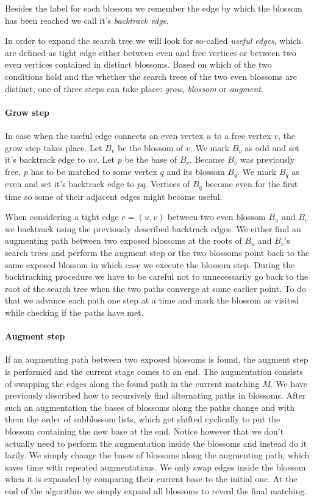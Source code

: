 Besides the label for each blossom we remember the edge by which the blossom has been reached we call it's \textit{backtrack edge}.

In order to expand the search tree we will look for so-called \textit{useful edges}, which are defined as tight edge either between even and free vertices or between two even vertices contained in distinct blossoms. Based on which of the two conditions hold and the whether the search trees of the two even blossoms are distinct, one of three steps can take place: \textit{grow}, \textit{blossom} or \textit{augment}.

\paragraph*{Grow step}

In case when the useful edge connects an even vertex $u$ to a free vertex $v$, the grow step takes place. Let $B_v$ be the blossom of $v$. We mark $B_v$ as odd and set it's backtrack edge to $uv$. Let $p$ be the base of $B_v$. Because $B_v$ was previously free, $p$ has to be matched to some vertex $q$ and its blossom $B_q$. We mark $B_q$ as even and set it's backtrack edge to $pq$. Vertices of $B_q$ become even for the first time so some of their adjacent edges might become useful.

When considering a tight edge $e=(u, v)$ between two even blossom $B_u$ and $B_v$ we backtrack using the previously described backtrack edges. We either find an augmenting path between two exposed blossoms at the roots of $B_u$ and $B_v$'s search trees and perform the augment step or the two blossoms point back to the same exposed blossom in which case we execute the blossom step. During the backtracking procedure we have to be careful not to unnecessarily go back to the root of the search tree when the two paths converge at some earlier point. To do that we advance each path one step at a time and mark the blossom as visited while checking if the paths have met.

\paragraph*{Augment step}

If an augmenting path between two exposed blossoms is found, the augment step is performed and the current stage comes to an end. The augmentation consists of swapping the edges along the found path in the current matching $M$. We have previously described how to recursively find alternating paths in blossoms. After such an augmentation the bases of blossoms along the paths change and with them the order of subblossom lists, which get shifted cyclically to put the blossom containing the new base at the end. Notice however that we don't actually need to perform the augmentation inside the blossoms and instead do it lazily. We simply change the bases of blossoms along the augmenting path, which saves time with repeated augmentations. We only swap edges inside the blossom when it is expanded by comparing their current base to the initial one. At the end of the algorithm we simply expand all blossoms to reveal the final matching.

